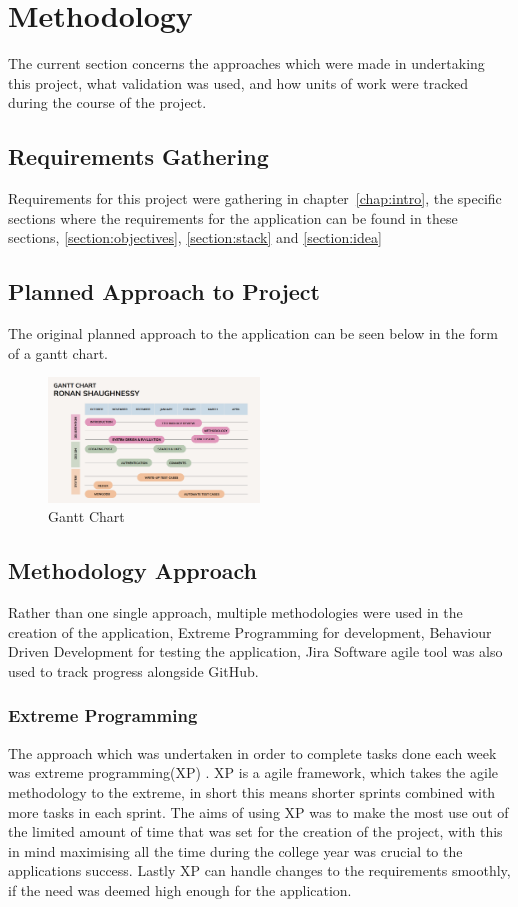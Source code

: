 \chapter{Methodology}
The current section concerns the approaches which were made in undertaking this project, what validation was used, and how units of work were tracked during the course of the project.

\section{Requirements Gathering}
Requirements for this project were gathering in chapter~\ref{chap:intro}, the specific sections where the requirements for the application can be found in these sections, \ref{section:objectives}, \ref{section:stack} and \ref{section:idea}

\section{Planned Approach to Project}
The original planned approach to the application can be seen below in the form of a gantt chart.

\begin{figure}[h!]
    \centering
    \includegraphics[width=0.5\textwidth]{images/GanttChart.png}
    \caption{Gantt Chart}
    \label{image:GanttChart}
\end{figure}

\newpage
\section{Methodology Approach}
Rather than one single approach, multiple methodologies were used in the creation of the application, Extreme Programming for development, Behaviour Driven Development for testing the application, Jira Software agile tool was also used to track progress alongside GitHub.

\subsection{Extreme Programming}
The approach which was undertaken in order to complete tasks done each week was extreme programming(XP) \cite{akhtar2022extreme}. XP is a agile framework, which takes the agile methodology to the extreme, in short this means shorter sprints combined with more tasks in each sprint. The aims of using XP was to make the most use out of the limited amount of time that was set for the creation of the project, with this in mind maximising all the time during the college year was crucial to the applications success. Lastly XP can handle changes to the requirements smoothly, if the need was deemed high enough for the application.

